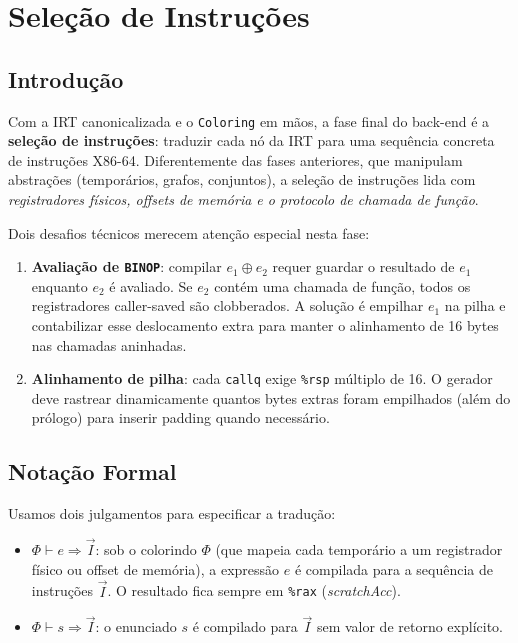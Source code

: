 \chapter{Seleção de Instruções}\label{chap:x86-codegen}

\section{Introdução}

Com a IRT canonicalizada e o \texttt{Coloring} em mãos, a fase final do
back-end é a \textbf{seleção de instruções}: traduzir cada nó da IRT para
uma sequência concreta de instruções X86-64. Diferentemente das fases
anteriores, que manipulam abstrações (temporários, grafos, conjuntos),
a seleção de instruções lida com \emph{registradores físicos, offsets de
memória e o protocolo de chamada de função}.

Dois desafios técnicos merecem atenção especial nesta fase:

\begin{enumerate}
  \item \textbf{Avaliação de \texttt{BINOP}}: compilar $e_1 \oplus e_2$
    requer guardar o resultado de $e_1$ enquanto $e_2$ é avaliado. Se
    $e_2$ contém uma chamada de função, todos os registradores caller-saved
    são clobberados. A solução é empilhar $e_1$ na pilha e contabilizar
    esse deslocamento extra para manter o alinhamento de 16 bytes nas
    chamadas aninhadas.
  \item \textbf{Alinhamento de pilha}: cada \texttt{callq} exige
    \texttt{\%rsp} múltiplo de 16. O gerador deve rastrear dinamicamente
    quantos bytes extras foram empilhados (além do prólogo) para inserir
    padding quando necessário.
\end{enumerate}

\section{Notação Formal}

Usamos dois julgamentos para especificar a tradução:

\begin{itemize}
  \item $\Phi \vdash e \Rightarrow \vec{I}$: sob o colorindo $\Phi$
    (que mapeia cada temporário a um registrador físico ou offset de memória),
    a expressão $e$ é compilada para a sequência de instruções $\vec{I}$.
    O resultado fica sempre em \texttt{\%rax} (\textit{scratchAcc}).

  \item $\Phi \vdash s \Rightarrow \vec{I}$: o enunciado $s$ é compilado
    para $\vec{I}$ sem valor de retorno explícito.
\end{itemize}

